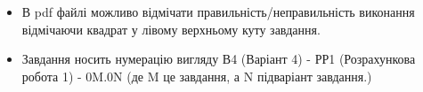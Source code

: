 \begin{itemize}
\item В pdf файлі можливо відмічати правильність/неправильність виконання відмічаючи квадрат у лівому верхньому куту завдання.
\item Завдання носить нумерацію вигляду В4 (Варіант 4) - РР1 (Розрахункова робота 1) - 0M.0N (де M це завдання, а N підваріант завдання.)
\end{itemize}
